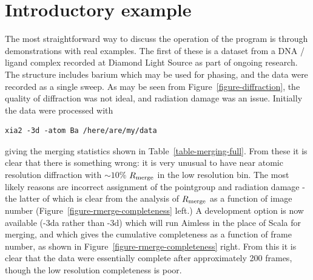 \documentclass[a4paper, 11pt]{article}
\begin{document}
\section{Introductory example}

The most straightforward way to discuss the operation of the program is 
through demonstrations with real examples. The first of these is a dataset
from a DNA / ligand complex recorded at Diamond Light Source as part of
ongoing research. The structure includes barium which may be used for phasing,
and the data were recorded as a single sweep. As may be seen from
Figure~\ref{figure-diffraction}, the quality of diffraction was not
ideal, and radiation damage was an issue. Initially the data were processed with 
\begin{verbatim}
xia2 -3d -atom Ba /here/are/my/data
\end{verbatim}

\noindent
giving the merging statistics shown in Table~\ref{table-merging-full}.
From these it is clear
that there is something wrong: it is very unusual to have near atomic 
resolution diffraction with $\sim 10\%$ $R_{\rm{merge}}$ in the low resolution
bin. The most likely reasons are incorrect assignment of the pointgroup and
radiation damage - the latter of which is clear from the analysis of 
$R_{\rm{merge}}$ as a function of image number
(Figure~\ref{figure-rmerge-completeness} left.) A development 
option is now available (-3da rather than -3d) which will run Aimless in the 
place of Scala for merging, and which gives the cumulative completeness as
a function of frame number, as shown in
Figure~\ref{figure-rmerge-completeness} right. From this it is clear 
that the data were essentially complete after approximately 200
frames, though the low resolution completeness is poor. 
\end{document}
